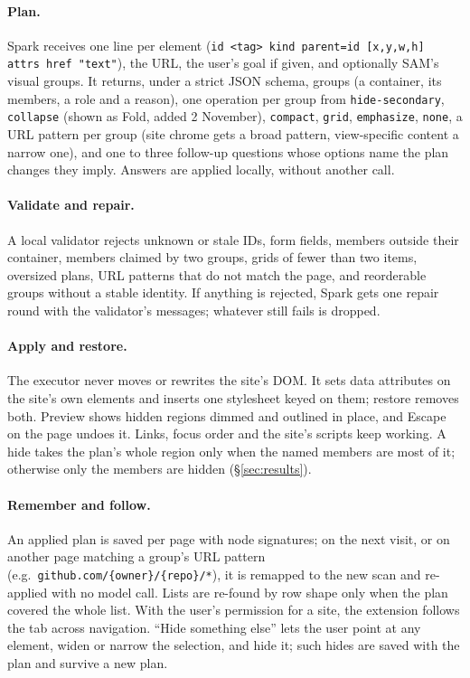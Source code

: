 \documentclass[10pt,a4paper]{article}
\begin{document}
\paragraph{Plan.} Spark receives one line per element (\texttt{id <tag> kind parent=id [x,y,w,h] attrs href "text"}), the URL, the user's goal if given, and optionally SAM's visual groups. It returns, under a strict JSON schema, groups (a container, its members, a role and a reason), one operation per group from \texttt{hide-secondary}, \texttt{collapse} (shown as Fold, added 2 November), \texttt{compact}, \texttt{grid}, \texttt{emphasize}, \texttt{none}, a URL pattern per group (site chrome gets a broad pattern, view-specific content a narrow one), and one to three follow-up questions whose options name the plan changes they imply. Answers are applied locally, without another call.

\paragraph{Validate and repair.} A local validator rejects unknown or stale IDs, form fields, members outside their container, members claimed by two groups, grids of fewer than two items, oversized plans, URL patterns that do not match the page, and reorderable groups without a stable identity. If anything is rejected, Spark gets one repair round with the validator's messages; whatever still fails is dropped.

\paragraph{Apply and restore.} The executor never moves or rewrites the site's DOM. It sets data attributes on the site's own elements and inserts one stylesheet keyed on them; restore removes both. Preview shows hidden regions dimmed and outlined in place, and Escape on the page undoes it. Links, focus order and the site's scripts keep working. A hide takes the plan's whole region only when the named members are most of it; otherwise only the members are hidden (\S\ref{sec:results}).

\paragraph{Remember and follow.} An applied plan is saved per page with node signatures; on the next visit, or on another page matching a group's URL pattern (e.g.\ \texttt{github.com/\{owner\}/\{repo\}/*}), it is remapped to the new scan and re-applied with no model call. Lists are re-found by row shape only when the plan covered the whole list. With the user's permission for a site, the extension follows the tab across navigation. ``Hide something else'' lets the user point at any element, widen or narrow the selection, and hide it; such hides are saved with the plan and survive a new plan.
\end{document}
